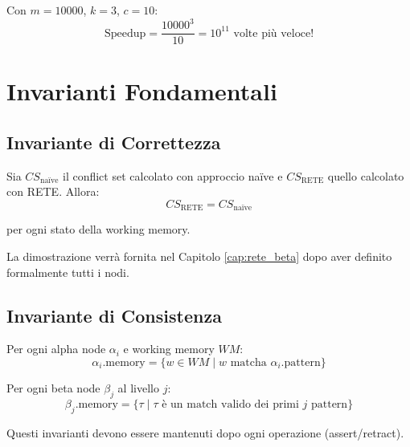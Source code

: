 Con $m=10000$, $k=3$, $c=10$:
\begin{equation}
\text{Speedup} = \frac{10000^3}{10} = 10^{11} \text{ volte più veloce!}
\end{equation}

\section{Invarianti Fondamentali}

\subsection{Invariante di Correttezza}

\begin{teorema}
\label{thm:rete_correctness}
Sia $CS_{\text{naïve}}$ il conflict set calcolato con approccio naïve e $CS_{\text{RETE}}$ quello calcolato con RETE. Allora:
\begin{equation}
CS_{\text{RETE}} = CS_{\text{naïve}}
\end{equation}

per ogni stato della working memory.
\end{teorema}

La dimostrazione verrà fornita nel Capitolo \ref{cap:rete_beta} dopo aver definito formalmente tutti i nodi.

\subsection{Invariante di Consistenza}

\begin{definizione}
Per ogni alpha node $\alpha_i$ e working memory $WM$:
\begin{equation}
\alpha_i.\text{memory} = \{w \in WM \mid w \text{ matcha } \alpha_i.\text{pattern}\}
\end{equation}
\end{definizione}

\begin{definizione}
Per ogni beta node $\beta_j$ al livello $j$:
\begin{equation}
\beta_j.\text{memory} = \{\tau \mid \tau \text{ è un match valido dei primi } j \text{ pattern}\}
\end{equation}
\end{definizione}

Questi invarianti devono essere mantenuti dopo ogni operazione (assert/retract).

